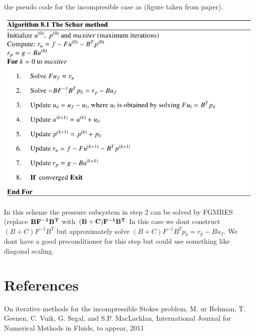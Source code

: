 the pseudo code for the incompresible case as (figure taken from paper).
\begin{center}
 \includegraphics{./SchurAlg.png}
\end{center}

In this scheme the pressure subsystem in step 2 can be solved by FGMRES (replace $\bf{B F^{-1} B^{T}}$ with $\bf{(B+C) F^{-1} B^{T}}$ In this case we dont construct $(B+C)F^{-1}B^{T}$ but approximately solve $(B+C)F^{-1}B^{T}p_{\delta} = r_{p} -Bu_{f}$. We dont have a good preconditioner for this step but could use something like diagonal scaling.

\section*{References}

On iterative methods for the incompressible Stokes problem, M. ur Rehman, T. Geenen, C. Vuik, G. Segal, and S.P. MacLachlan, International Journal for Numerical Methods in Fluids, to appear, 2011